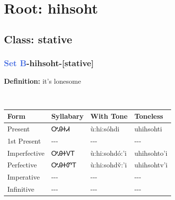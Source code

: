\needspace{4in}
\section*{Root: hihsoht}
\nopagebreak
{}
\needspace{3in}
\subsection*{Class: stative}
\nopagebreak
\needspace{2in}
\subsubsection*{\textcolor{RoyalBlue}{Set B}{-}\textbf{hihsoht}{-}[stative]}
\nopagebreak
\textbf{Definition: } it{\textquoteright}s lonesome
\\[0.5em]
\begin{tabularx}{\textwidth}{l X X X}%
\toprule%
\textbf{Form}&\textbf{Syllabary}&\textbf{With Tone}&\textbf{Toneless}\\%
\midrule%
Present&ᎤᎯᏐᏗ&ù:hi:sóhdi&uhihsohti\\%
1st Present&{-}{-}{-}&{-}{-}{-}&{-}{-}{-}\\%
Imperfective&ᎤᎯᏐᏙᎢ&ù:hi:sohdó:’i&uhihsohto'i\\%
Perfective&ᎤᎯᏐᏛᎢ&ù:hi:sohdv̌:’i&uhihsohtv'i\\%
Imperative&{-}{-}{-}&{-}{-}{-}&{-}{-}{-}\\%
Infinitive&{-}{-}{-}&{-}{-}{-}&{-}{-}{-}\\%
\bottomrule%
\end{tabularx}
\\[1em]